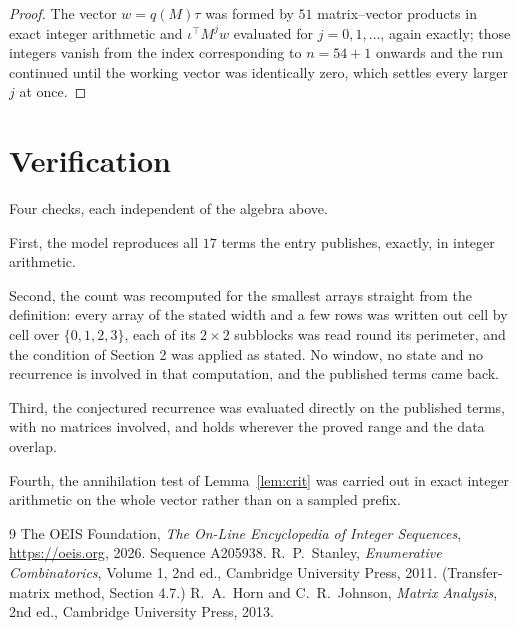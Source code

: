 \documentclass[11pt,a4paper]{article}
\theoremstyle{plain}
\theoremstyle{definition}
\begin{document}
\begin{proof}
The vector $w=q(M)\tau$ was formed by $51$ matrix--vector products in exact integer
arithmetic and $\iota^{\!\top}M^{j}w$ evaluated for $j=0,1,\dots$, again exactly; those
integers vanish from the index corresponding to $n=54+1$ onwards and the run continued
until the working vector was identically zero, which settles every larger $j$ at once.
\end{proof}

\section{Verification}

Four checks, each independent of the algebra above.

First, the model reproduces all $17$ terms the entry publishes, exactly, in integer
arithmetic.

Second, the count was recomputed for the smallest arrays straight from the definition: every
array of the stated width and a few rows was written out cell by cell over $\{0,1,2,3\}$, each of
its $2\times2$ subblocks was read round its perimeter, and the condition of Section 2 was
applied as stated. No window, no state and no recurrence is involved in that computation, and
the published terms came back.

Third, the conjectured recurrence was evaluated directly on the published terms, with no
matrices involved, and holds wherever the proved range and the data overlap.

Fourth, the annihilation test of Lemma~\ref{lem:crit} was carried out in exact integer
arithmetic on the whole vector rather than on a sampled prefix.

\begin{thebibliography}{9}
 The OEIS Foundation, \emph{The On-Line Encyclopedia of Integer
Sequences}, \url{https://oeis.org}, 2026. Sequence A205938.
 R.~P.~Stanley, \emph{Enumerative Combinatorics}, Volume 1, 2nd ed.,
Cambridge University Press, 2011. (Transfer-matrix method, Section 4.7.)
 R.~A.~Horn and C.~R.~Johnson, \emph{Matrix Analysis}, 2nd ed., Cambridge
University Press, 2013.
\end{thebibliography}
\end{document}
